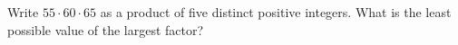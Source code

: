 Write $55\cdot60\cdot65$ as a product of five distinct positive integers. What is the least possible value of the largest factor?
